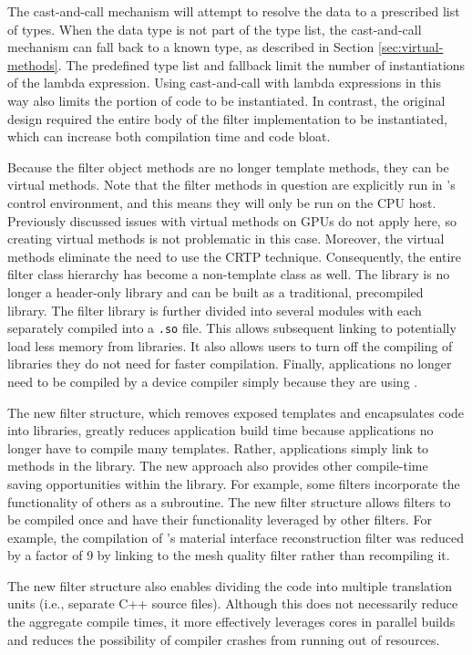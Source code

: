 The cast-and-call mechanism will attempt to resolve the data to a prescribed list of types.
When the data type is not part of the type list, the cast-and-call mechanism can fall back to a known type, as described in Section \ref{sec:virtual-methods}.
The predefined type list and fallback limit the number of instantiations of the lambda expression.
Using cast-and-call with lambda expressions in this way also limits the portion of code to be instantiated.
In contrast, the original design required the entire body of the filter implementation to be instantiated, which can increase both compilation time and code bloat.

Because the filter object methods are no longer template methods, they can be virtual methods.
Note that the filter methods in question are explicitly run in \vtkm's control environment, and this means they will only be run on the CPU host.
Previously discussed issues with virtual methods on GPUs do not apply here, so creating virtual methods is not problematic in this case.
Moreover, the virtual methods eliminate the need to use the CRTP technique.
Consequently, the entire filter class hierarchy has become a non-template class as well.
The library is no longer a header-only library and can be built as a traditional, precompiled library.
The filter library is further divided into several modules with each separately compiled into a \texttt{.so} file.
This allows subsequent linking to potentially load less memory from libraries.
It also allows users to turn off the compiling of libraries they do not need for faster compilation.
Finally, applications no longer need to be compiled by a device compiler simply because they are using \vtkm.

The new filter structure, which removes exposed templates and encapsulates code into libraries, greatly reduces application build time because applications no longer have to compile many \vtkm templates.
Rather, applications simply link to methods in the \vtkm library.
The new approach also provides other compile-time saving opportunities within the library.
For example, some filters incorporate the functionality of others as a subroutine.
The new filter structure allows filters to be compiled once and have their functionality leveraged by other filters.
For example, the compilation of \vtkm's material interface reconstruction filter was reduced by a factor of 9 by linking to the mesh quality filter rather than recompiling it.

The new filter structure also enables dividing the code into multiple translation units (i.e., separate C++ source files).
Although this does not necessarily reduce the aggregate compile times, it more effectively leverages cores in parallel builds and reduces the possibility of compiler crashes from running out of resources.

